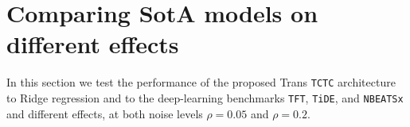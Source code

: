 \documentclass{article}
\begin{document}

\section{Comparing SotA models on different effects}

In this section we test the performance of the proposed Trans \texttt{TCTC} architecture to Ridge regression and to the deep-learning benchmarks \texttt{TFT}, \texttt{TiDE}, and \texttt{NBEATSx} and different effects, at both noise levels $\rho =0.05$ and $\rho = 0.2$.
\end{document}

